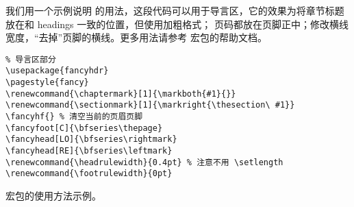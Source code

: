 我们用一个示例说明  的用法，这段代码可以用于导言区，它的效果为将章节标题放在和 headings 一致的位置，但使用加粗格式；
页码都放在页脚正中；修改横线宽度，“去掉”页脚的横线。更多用法请参考  宏包的帮助文档。

\begin{sourcecode}[hbp]
\begin{Verbatim}
% 导言区部分
\usepackage{fancyhdr}
\pagestyle{fancy}
\renewcommand{\chaptermark}[1]{\markboth{#1}{}}
\renewcommand{\sectionmark}[1]{\markright{\thesection\ #1}}
\fancyhf{} % 清空当前的页眉页脚
\fancyfoot[C]{\bfseries\thepage}
\fancyhead[LO]{\bfseries\rightmark}
\fancyhead[RE]{\bfseries\leftmark}
\renewcommand{\headrulewidth}{0.4pt} % 注意不用 \setlength
\renewcommand{\footrulewidth}{0pt}
\end{Verbatim}
\caption{ 宏包的使用方法示例。}\label{code:fancyhdr}
\end{sourcecode}

\endinput